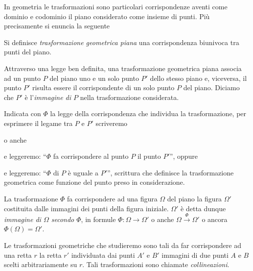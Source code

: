 In geometria le trasformazioni sono particolari corrispondenze aventi 
come dominio e codominio il piano considerato come insieme di punti. 
Più precisamente si enuncia la seguente

\begin{definizione}
Si definisce \emph{trasformazione geometrica piana} una 
corrispondenza biunivoca tra punti del piano.
\end{definizione}

Attraverso una legge ben definita, una trasformazione geometrica 
piana associa ad un punto $P$ del piano uno e un solo punto $P'$ 
dello stesso piano e, viceversa, il punto $P'$ risulta essere il 
corrispondente di un solo punto $P$ del piano. Diciamo che $P'$ è 
l'\emph{immagine di $P$} nella trasformazione considerata.


Indicata con $\Phi$ la legge della corrispondenza che individua la 
trasformazione, per esprimere il legame tra $P$ e $P'$ scriveremo

\noindent
\begin{center}
\qquad o 
anche\qquad {}
\end{center}

\noindent e leggeremo: ``$\Phi$ fa corrispondere al punto $P$ il 
punto $P'$'', oppure

\noindent
\begin{center}\end{center}

\noindent e leggeremo: ``$\Phi$ di $P$ è uguale a $P'$'', scrittura 
che definisce la trasformazione geometrica come funzione del punto 
preso in considerazione.

La trasformazione $\Phi$ fa corrispondere ad una figura $\Omega$ del 
piano la figura $\Omega'$ costituita dalle immagini dei punti della 
figura iniziale. $\Omega'$ è detta dunque \emph{immagine di $\Omega$ 
secondo $\Phi$}, in formule $\Phi: \Omega \rightarrow \Omega'$ o 
anche $\Omega\overset{\Phi}{\rightarrow}\Omega'$ o ancora 
$\Phi(\Omega)=\Omega'$.

Le trasformazioni geometriche che studieremo sono tali da far 
corrispondere ad una retta $r$ la retta $r'$ individuata dai punti 
$A'$ e $B'$ immagini di due punti $A$ e $B$ scelti arbitrariamente su 
$r$. Tali trasformazioni sono chiamate \emph{collineazioni}.

